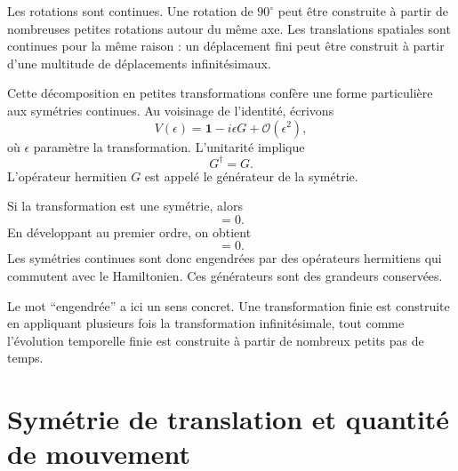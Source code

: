 Les rotations sont continues. Une rotation de \(90^\circ\) peut être construite à partir de nombreuses petites rotations autour du même axe. Les translations spatiales sont continues pour la même raison : un déplacement fini peut être construit à partir d’une multitude de déplacements infinitésimaux.

Cette décomposition en petites transformations confère une forme particulière aux symétries continues. Au voisinage de l’identité, écrivons
\begin{equation}
V(\epsilon)
=
\mathbf 1-i\epsilon G+\mathcal O(\epsilon^2),
\end{equation}
où \(\epsilon\) paramètre la transformation. L’unitarité implique
\begin{equation}
G^\dagger=G.
\end{equation}
L’opérateur hermitien \(G\) est appelé le générateur de la symétrie.

Si la transformation est une symétrie, alors
\begin{equation}
[H,V(\epsilon)]=0.
\end{equation}
En développant au premier ordre, on obtient
\begin{equation}
[H,G]=0.
\end{equation}
Les symétries continues sont donc engendrées par des opérateurs hermitiens qui commutent avec le Hamiltonien. Ces générateurs sont des grandeurs conservées.

Le mot ``engendrée'' a ici un sens concret. Une transformation finie est construite en appliquant plusieurs fois la transformation infinitésimale, tout comme l’évolution temporelle finie est construite à partir de nombreux petits pas de temps.

\section{Symétrie de translation et quantité de mouvement}

